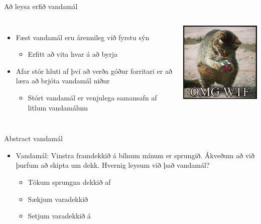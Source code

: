 \documentclass{beamer}
\begin{document}
\begin{frame}{Að leysa erfið vandamál}
\begin{columns}
\begin{itemize}
 \item Fæst vandamál eru árennileg við fyrstu sýn
 \begin{itemize}
  \item Erfitt að vita hvar á að byrja
 \end{itemize}
 \item Afar stór hluti af því að verða góður forritari er að læra að brjóta vandamál niður
 \begin{itemize}
  \item Stórt vandamál er venjulega samansafn af litlum vandamálum
 \end{itemize}
\end{itemize}

\begin{center}
\includegraphics[width=0.8\linewidth]{Pics/catcube}
\end{center}
\end{columns}
\end{frame}

\begin{frame}{Abstract vandamál}
\begin{itemize}
 \item Vandamál: Vinstra framdekkið á bílnum mínum er sprungið. Ákveðum að við þurfum að skipta um dekk. Hvernig leysum við það vandamál? \pause
 \begin{itemize}
  \item Tökum sprungna dekkið af
  \item Sækjum varadekkið
  \item Setjum varadekkið á
 \end{itemize}
\end{itemize}
\end{frame}
\end{document}
